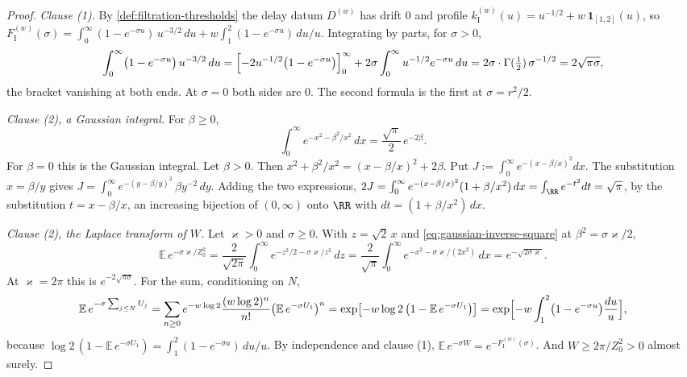 \begin{proof}
\emph{Clause (1).} By \ref{def:filtration-thresholds} the delay datum $D^{(w)}$ has drift $0$
and profile $k^{(w)}_{\mathrm I}(u) = u^{-1/2} + w\,\mathbf 1_{[1,2]}(u)$, so
$F^{(w)}_{\mathrm I}(\sigma) = \int_0^\infty(1 - e^{-\sigma u})\,u^{-3/2}\,du +
w\int_1^2(1 - e^{-\sigma u})\,du/u$. Integrating by parts, for $\sigma > 0$,
\[
  \int_0^\infty\bigl(1 - e^{-\sigma u}\bigr)\,u^{-3/2}\,du
   = \Bigl[-2u^{-1/2}\bigl(1 - e^{-\sigma u}\bigr)\Bigr]_0^\infty
     + 2\sigma\int_0^\infty u^{-1/2}e^{-\sigma u}\,du
   = 2\sigma\cdot\Gamma(\tfrac12)\,\sigma^{-1/2} = 2\sqrt{\pi\sigma} ,
\]
the bracket vanishing at both ends. At $\sigma = 0$ both sides are $0$. The second formula is the
first at $\sigma = r^2/2$.

\emph{Clause (2), a Gaussian integral.} For $\beta \ge 0$,
\begin{equation}\label{eq:gaussian-inverse-square}
  \int_0^\infty e^{-x^2 - \beta^2/x^2}\,dx = \frac{\sqrt\pi}{2}\,e^{-2\beta} .
\end{equation}
For $\beta = 0$ this is the Gaussian integral. Let $\beta > 0$. Then
$x^2 + \beta^2/x^2 = (x - \beta/x)^2 + 2\beta$. Put
$J := \int_0^\infty e^{-(x - \beta/x)^2}dx$. The substitution $x = \beta/y$ gives
$J = \int_0^\infty e^{-(y - \beta/y)^2}\,\beta y^{-2}\,dy$. Adding the two expressions,
$2J = \int_0^\infty e^{-(x - \beta/x)^2}(1 + \beta/x^2)\,dx = \int_{\RR}e^{-t^2}dt = \sqrt\pi$,
by the substitution $t = x - \beta/x$, an increasing bijection of $(0,\infty)$ onto $\RR$ with
$dt = (1 + \beta/x^2)\,dx$.

\emph{Clause (2), the Laplace transform of $W$.} Let $\varkappa > 0$ and $\sigma \ge 0$. With
$z = \sqrt2\,x$ and \ref{eq:gaussian-inverse-square} at $\beta^2 = \sigma\varkappa/2$,
\[
  \mathbb{E}\,e^{-\sigma\varkappa/Z_0^2}
   = \frac{2}{\sqrt{2\pi}}\int_0^\infty e^{-z^2/2 - \sigma\varkappa/z^2}\,dz
   = \frac{2}{\sqrt\pi}\int_0^\infty e^{-x^2 - \sigma\varkappa/(2x^2)}\,dx
   = e^{-\sqrt{2\sigma\varkappa}} .
\]
At $\varkappa = 2\pi$ this is $e^{-2\sqrt{\pi\sigma}}$. For the sum, conditioning on $N$,
\[
  \mathbb{E}\,e^{-\sigma\sum_{j \le N}U_j}
   = \sum_{n \ge 0}e^{-w\log 2}\frac{(w\log 2)^n}{n!}\bigl(\mathbb{E}\,e^{-\sigma U_1}\bigr)^n
   = \exp\bigl[-w\log 2\,\bigl(1 - \mathbb{E}\,e^{-\sigma U_1}\bigr)\bigr]
   = \exp\Bigl[-w\int_1^2\bigl(1 - e^{-\sigma u}\bigr)\frac{du}{u}\Bigr] ,
\]
because $\log 2\,(1 - \mathbb{E}\,e^{-\sigma U_1}) = \int_1^2(1 - e^{-\sigma u})\,du/u$. By
independence and clause (1), $\mathbb{E}\,e^{-\sigma W} = e^{-F^{(w)}_{\mathrm I}(\sigma)}$. And
$W \ge 2\pi/Z_0^2 > 0$ almost surely.


\end{proof}

